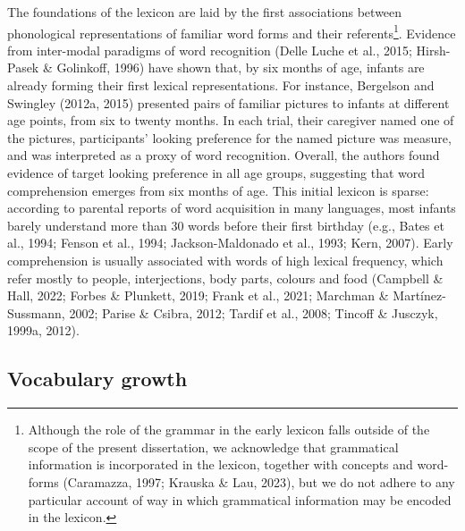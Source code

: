 \documentclass[
  12pt,
  b5paperpaper,
  twoside]{scrreprt}
\begin{document}
The foundations of the lexicon are laid by the first associations
between phonological representations of familiar word forms and their
referents\footnote{Although the role of the grammar in the early lexicon
  falls outside of the scope of the present dissertation, we acknowledge
  that grammatical information is incorporated in the lexicon, together
  with concepts and word-forms (Caramazza, 1997; Krauska \& Lau, 2023),
  but we do not adhere to any particular account of way in which
  grammatical information may be encoded in the lexicon.}. Evidence from
inter-modal paradigms of word recognition (Delle Luche et al., 2015;
Hirsh-Pasek \& Golinkoff, 1996) have shown that, by six months of age,
infants are already forming their first lexical representations. For
instance, Bergelson and Swingley (2012a, 2015) presented pairs of
familiar pictures to infants at different age points, from six to twenty
months. In each trial, their caregiver named one of the pictures,
participants' looking preference for the named picture was measure, and
was interpreted as a proxy of word recognition. Overall, the authors
found evidence of target looking preference in all age groups,
suggesting that word comprehension emerges from six months of age. This
initial lexicon is sparse: according to parental reports of word
acquisition in many languages, most infants barely understand more than
30 words before their first birthday (e.g., Bates et al., 1994; Fenson
et al., 1994; Jackson-Maldonado et al., 1993; Kern, 2007). Early
comprehension is usually associated with words of high lexical
frequency, which refer mostly to people, interjections, body parts,
colours and food (Campbell \& Hall, 2022; Forbes \& Plunkett, 2019;
Frank et al., 2021; Marchman \& Martínez-Sussmann, 2002; Parise \&
Csibra, 2012; Tardif et al., 2008; Tincoff \& Jusczyk, 1999a, 2012).

\hypertarget{vocabulary-growth}{%
\subsection{Vocabulary growth}\label{vocabulary-growth}}
\end{document}
